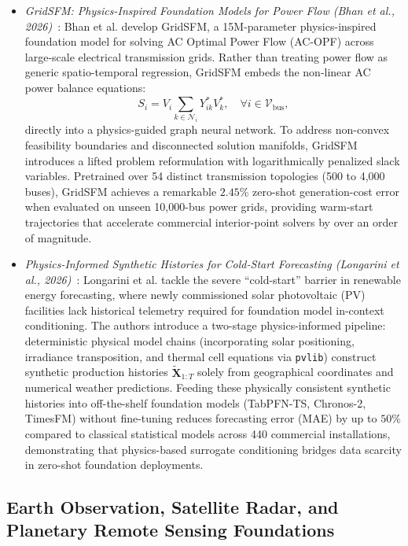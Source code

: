 \begin{itemize}[leftmargin=*]
    \item \emph{GridSFM: Physics-Inspired Foundation Models for Power Flow (Bhan et al., 2026)}~\cite{bhan2026gridsfm}: Bhan et al. develop GridSFM, a 15M-parameter physics-inspired foundation model for solving AC Optimal Power Flow (AC-OPF) across large-scale electrical transmission grids. Rather than treating power flow as generic spatio-temporal regression, GridSFM embeds the non-linear AC power balance equations:
    \begin{equation}
        S_i = V_i \sum_{k \in \mathcal{N}_i} Y_{ik}^* V_k^*, \quad \forall i \in \mathcal{V}_{\text{bus}},
    \end{equation}
    directly into a physics-guided graph neural network. To address non-convex feasibility boundaries and disconnected solution manifolds, GridSFM introduces a lifted problem reformulation with logarithmically penalized slack variables. Pretrained over 54 distinct transmission topologies (500 to 4,000 buses), GridSFM achieves a remarkable $2.45\%$ zero-shot generation-cost error when evaluated on unseen 10,000-bus power grids, providing warm-start trajectories that accelerate commercial interior-point solvers by over an order of magnitude.
    \item \emph{Physics-Informed Synthetic Histories for Cold-Start Forecasting (Longarini et al., 2026)}~\cite{longarini2026physics}: Longarini et al. tackle the severe ``cold-start'' barrier in renewable energy forecasting, where newly commissioned solar photovoltaic (PV) facilities lack historical telemetry required for foundation model in-context conditioning. The authors introduce a two-stage physics-informed pipeline: deterministic physical model chains (incorporating solar positioning, irradiance transposition, and thermal cell equations via \texttt{pvlib}) construct synthetic production histories $\tilde{\mathbf{X}}_{1:T}$ solely from geographical coordinates and numerical weather predictions. Feeding these physically consistent synthetic histories into off-the-shelf foundation models (TabPFN-TS, Chronos-2, TimesFM) without fine-tuning reduces forecasting error (MAE) by up to $50\%$ compared to classical statistical models across 440 commercial installations, demonstrating that physics-based surrogate conditioning bridges data scarcity in zero-shot foundation deployments.
\end{itemize}

\subsection{Earth Observation, Satellite Radar, and Planetary Remote Sensing Foundations}
\label{sec:earth_observation_foundations}

